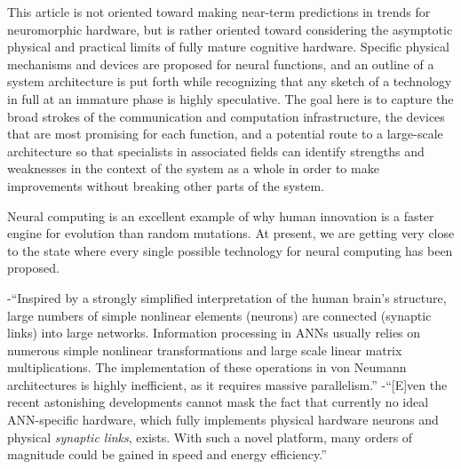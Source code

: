 \vspace{3em}
This article is not oriented toward making near-term predictions in trends for neuromorphic hardware, but is rather oriented toward considering the asymptotic physical and practical limits of fully mature cognitive hardware. Specific physical mechanisms and devices are proposed for neural functions, and an outline of a system architecture is put forth while recognizing that any sketch of a technology in full at an immature phase is highly speculative. The goal here is to capture the broad strokes of the communication and computation infrastructure, the devices that are most promising for each function, and a potential route to a large-scale architecture so that specialists in associated fields can identify strengths and weaknesses in the context of the system as a whole in order to make improvements without breaking other parts of the system.

\vspace{3em}
Neural computing is an excellent example of why human innovation is a faster engine for evolution than random mutations. At present, we are getting very close to the state where every single possible technology for neural computing has been proposed.


\vspace{3em}
\cite{brpe2018}
-``Inspired by a strongly simplified interpretation of the human brain's structure, large numbers of simple nonlinear elements (neurons) are connected (synaptic links) into large networks. Information processing in ANNs usually relies on numerous simple nonlinear transformations and large scale linear matrix multiplications. The implementation of these operations in von Neumann architectures is highly inefficient, as it requires massive parallelism.''
-``[E]ven the recent astonishing developments cannot mask the fact that currently no ideal ANN-specific hardware, which fully implements physical hardware neurons and physical \textit{synaptic links}, exists. With such a novel platform, many orders of magnitude could be gained in speed and energy efficiency.''